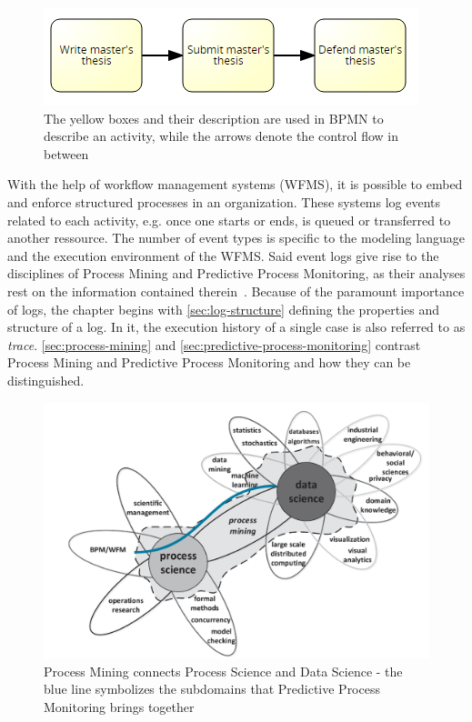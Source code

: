 \begin{figure}[!htb]
    \centering
    \includegraphics[width=.75\textwidth]{gfx/activity-introduction.png}
    \caption[Control flow in BPMN]{The yellow boxes and their description are used in BPMN to describe an activity, while the arrows denote the control flow in between}
    \label{fig:activity-introduction}
\end{figure}

With the help of workflow management systems (WFMS), it is possible to embed and enforce structured processes in an organization. These systems log events related to each activity, e.g. once one starts or ends, is queued or transferred to another ressource. The number of event types is specific to the modeling language and the execution environment of the WFMS. Said event logs give rise to the disciplines of Process Mining and Predictive Process Monitoring, as their analyses rest on the information contained therein~\cite{Aalst2016}. Because of the paramount importance of logs, the chapter begins with \autoref{sec:log-structure} defining the properties and structure of a log. In it, the execution history of a single case is also referred to as \textit{trace}. \autoref{sec:process-mining} and \autoref{sec:predictive-process-monitoring} contrast Process Mining and Predictive Process Monitoring and how they can be distinguished.

\begin{figure}[!htb]
    \centering
    \includegraphics[width=.8\textwidth]{gfx/process-data-science.png}
    \caption[Process Mining connects Process Science and Data Science]{Process Mining connects Process Science and Data Science \cite[p.18]{Aalst2016} - the blue line symbolizes the subdomains that Predictive Process Monitoring brings together}
    \label{fig:process-data-science}
\end{figure}

